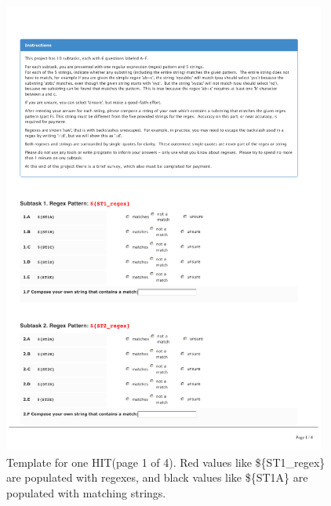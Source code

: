 \begin{figure}[!htbp]
       \includegraphics[page=1, height=15cm, keepaspectratio]{nontex/MTtemplate}
 \caption{Template for one HIT(page 1 of 4).  Red values like  \$\{ST1\_regex\} are populated with regexes, and black values like \$\{ST1A\} are populated with matching strings.}
 \label{fig:MTtemplate1}
\end{figure}

